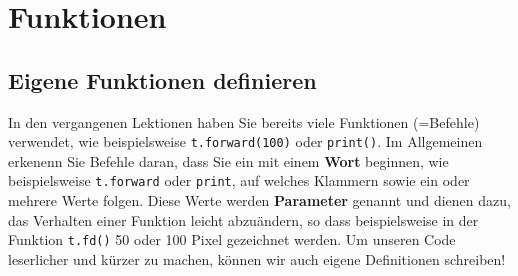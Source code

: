 \chapter{Funktionen}

\section{Eigene Funktionen  definieren}

In den vergangenen Lektionen haben Sie bereits viele Funktionen (=Befehle) verwendet, wie beispielsweise \lstinline|t.forward(100)| oder \lstinline|print()|. Im Allgemeinen erkenenn Sie Befehle daran, dass Sie ein mit einem \textbf{Wort} beginnen, wie beispielsweise \lstinline|t.forward| oder \lstinline|print|, auf welches Klammern sowie ein oder mehrere Werte folgen. Diese Werte werden \textbf{Parameter} genannt und dienen dazu, das Verhalten einer Funktion leicht abzuändern, so dass beispielsweise in der Funktion \lstinline|t.fd()| 50 oder 100 Pixel gezeichnet werden. Um unseren Code leserlicher und kürzer zu machen, können wir auch eigene Definitionen schreiben!

